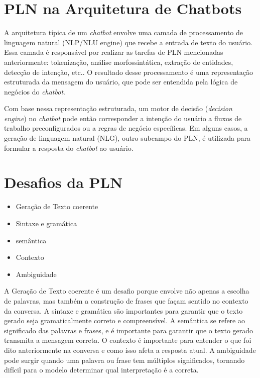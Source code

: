 \documentclass[14pt,a4paper,oneside]{book}
\begin{document}
\section{PLN na Arquitetura de Chatbots}

A arquitetura típica de um \textit{chatbot} envolve uma camada de processamento de linguagem natural (NLP/NLU engine) que recebe a entrada de texto do usuário. Essa camada é responsável por realizar as tarefas de PLN mencionadas anteriormente: tokenização, análise morfossintática, extração de entidades, detecção de intenção, etc.. O resultado desse processamento é uma representação estruturada da mensagem do usuário, que pode ser entendida pela lógica de negócios do \textit{chatbot}.

Com base nessa representação estruturada, um motor de decisão (\textit{decision engine}) no \textit{chatbot} pode então corresponder a intenção do usuário a fluxos de trabalho preconfigurados ou a regras de negócio específicas. Em alguns casos, a geração de linguagem natural (NLG), outro subcampo do PLN, é utilizada para formular a resposta do \textit{chatbot} ao usuário.

\section{Desafios da PLN}

\begin{itemize}
	\item Geração de Texto coerente
	\item Sintaxe e gramática
	\item semântica
	\item Contexto
	\item Ambiguidade
\end{itemize}

A Geração de Texto coerente é um desafio porque envolve não apenas a escolha de palavras, mas também a construção de frases que façam sentido no contexto da conversa. A sintaxe e gramática são importantes para garantir que o texto gerado seja gramaticalmente correto e compreensível. A semântica se refere ao significado das palavras e frases, e é importante para garantir que o texto gerado transmita a mensagem correta. O contexto é importante para entender o que foi dito anteriormente na conversa e como isso afeta a resposta atual. A ambiguidade pode surgir quando uma palavra ou frase tem múltiplos significados, tornando difícil para o modelo determinar qual interpretação é a correta.
\end{document}
